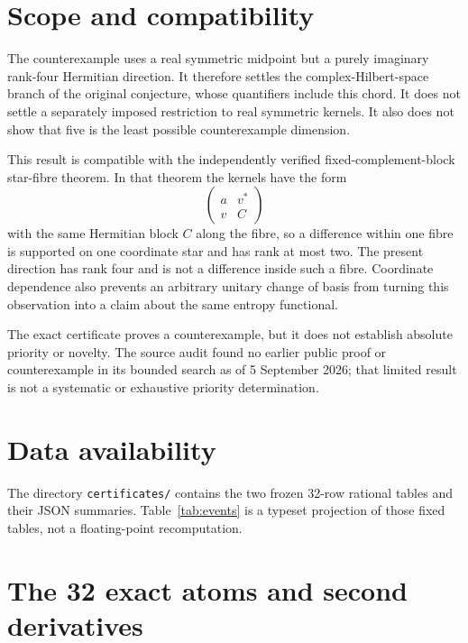 \documentclass[11pt]{article}
\begin{document}
\section{Scope and compatibility}

The counterexample uses a real symmetric midpoint but a purely imaginary
rank-four Hermitian direction.  It therefore settles the complex-Hilbert-space
branch of the original conjecture, whose quantifiers include this chord.  It does
not settle a separately imposed restriction to real symmetric kernels.  It also
does not show that five is the least possible counterexample dimension.

This result is compatible with the independently verified fixed-complement-block
star-fibre theorem.  In that theorem the kernels have the form
\[
 \begin{pmatrix}a&v^*\\v&C\end{pmatrix}
\]
with the same Hermitian block $C$ along the fibre, so a difference within one
fibre is supported on one coordinate star and has rank at most two.  The present
direction has rank four and is not a difference inside such a fibre.  Coordinate
dependence also prevents an arbitrary unitary change of basis from turning this
observation into a claim about the same entropy functional.

The exact certificate proves a counterexample, but it does not establish absolute
priority or novelty.  The source audit found no earlier public proof or
counterexample in its bounded search as of 5 September 2026; that limited result
is not a systematic or exhaustive priority determination.

\section*{Data availability}

The directory \texttt{certificates/} contains the two frozen 32-row rational
tables and their JSON summaries.  Table~\ref{tab:events} is a typeset projection
of those fixed tables, not a floating-point recomputation.

\appendix
\section{The 32 exact atoms and second derivatives}
\begingroup\scriptsize

\endgroup



\end{document}
